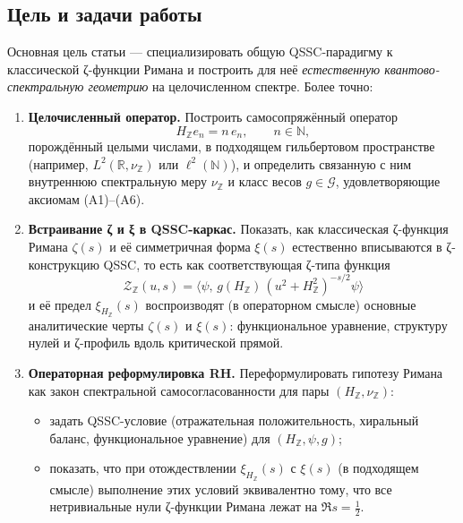 \documentclass{article}
\numberwithin{equation}{section}
\theoremstyle{plain}
\theoremstyle{definition}
\theoremstyle{remark}
\begin{document}
\subsection{Цель и задачи работы}
\label{subsec:goals}

\noindent
Основная цель статьи --- специализировать общую QSSC-парадигму
к классической ζ-функции Римана и построить для неё \emph{естественную
квантово-спектральную геометрию} на целочисленном спектре. Более точно:

\begin{enumerate}[label=(\roman*), leftmargin=2.3em]
  \item \textbf{Целочисленный оператор.}
  Построить самосопряжённый оператор
  \begin{equation}
  H_{\mathbb Z} e_n = n\,e_n,\qquad n\in\mathbb N,
  \label{eq:intro-HZ-goal}
  \end{equation}
  порождённый целыми числами, в подходящем гильбертовом пространстве
  (например, $L^2(\mathbb R,\nu_{\mathbb Z})$ или $\ell^2(\mathbb N)$),
  и определить связанную с ним внутреннюю спектральную меру
  $\nu_{\mathbb Z}$ и класс весов $g\in\mathcal G$, удовлетворяющие
  аксиомам (A1)–(A6).

  \item \textbf{Встраивание ζ и ξ в QSSC-каркас.}
  Показать, как классическая ζ-функция Римана $\zeta(s)$ и её симметричная
  форма $\xi(s)$ естественно вписываются в ζ-конструкцию QSSC, то есть как
  соответствующая ζ-типа функция
  \begin{equation}
  \mathcal Z_{\mathbb Z}(u,s)
  =
  \big\langle \psi,\,
  g(H_{\mathbb Z})\,(u^2+H_{\mathbb Z}^2)^{-s/2}\psi\big\rangle
  \label{eq:intro-ZZ-goal}
  \end{equation}
  и её предел $\xi_{H_{\mathbb Z}}(s)$ воспроизводят (в операторном смысле)
  основные аналитические черты $\zeta(s)$ и $\xi(s)$: функциональное
  уравнение, структуру нулей и ζ-профиль вдоль критической прямой.

  \item \textbf{Операторная реформулировка RH.}
  Переформулировать гипотезу Римана как закон спектральной
  самосогласованности для пары $(H_{\mathbb Z},\nu_{\mathbb Z})$:
  \begin{itemize}[leftmargin=2.4em]
    \item задать QSSC-условие (отражательная положительность, хиральный
    баланс, функциональное уравнение) для $(H_{\mathbb Z},\psi,g)$;

    \item показать, что при отождествлении $\xi_{H_{\mathbb Z}}(s)$ с
    $\xi(s)$ (в подходящем смысле) выполнение этих условий эквивалентно тому,
    что все нетривиальные нули ζ-функции Римана лежат на $\Re s=\tfrac12$.
  \end{itemize}
\end{enumerate}
\end{document}
